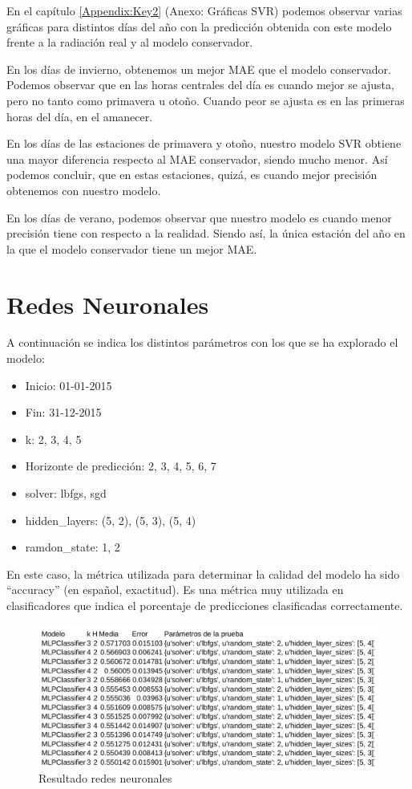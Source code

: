 En el capítulo \ref{Appendix:Key2} (Anexo: Gráficas SVR) podemos observar varias gráficas para distintos días del año con la predicción obtenida con este modelo frente a la radiación real y al modelo conservador.

En los días de invierno, obtenemos un mejor MAE que el modelo conservador. Podemos observar que en las horas centrales del día es cuando mejor se ajusta, pero no tanto como primavera u otoño. Cuando peor se ajusta es en las primeras horas del día, en el amanecer.

En los días de las estaciones de primavera y otoño, nuestro modelo SVR obtiene una mayor diferencia respecto al MAE conservador, siendo mucho menor. Así podemos concluir, que en estas estaciones, quizá, es cuando mejor precisión obtenemos con nuestro modelo.

En los días de verano, podemos observar que nuestro modelo es cuando menor precisión tiene con respecto a la realidad. Siendo así, la única estación del año en la que el modelo conservador tiene un mejor MAE.

\section{Redes Neuronales}
\label{makereference7.3}

A continuación se indica los distintos parámetros con los que se ha explorado el modelo:

\begin{itemize}
\item Inicio: 01-01-2015
\item Fin: 31-12-2015
\item k: 2, 3, 4, 5
\item Horizonte de predicción: 2, 3, 4, 5, 6, 7
\item solver: lbfgs, sgd
\item hidden\_layers: (5, 2), (5, 3), (5, 4)
\item ramdon\_state: 1, 2
\end{itemize}

En este caso, la métrica utilizada para determinar la calidad del modelo ha sido ``accuracy'' (en español, exactitud). Es una métrica muy utilizada en clasificadores que indica el porcentaje de predicciones clasificadas correctamente.

\begin{figure}[htb]
	\begin{center}
		\includegraphics[width=17cm]{figures/resultado_mlp.png}
		\caption{Resultado redes neuronales \label{resultado_mlp}}
	\end{center}
\end{figure}

